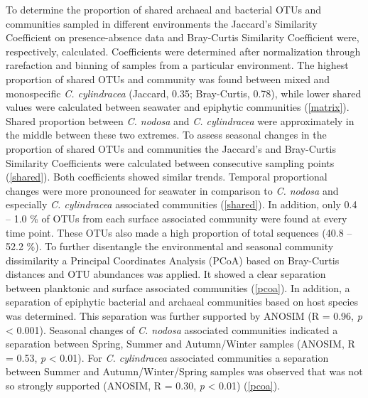 \documentclass[12pt,]{article}
\begin{document}
To determine the proportion of shared archaeal and bacterial OTUs and
communities sampled in different environments the Jaccard's Similarity
Coefficient on presence-absence data and Bray-Curtis Similarity
Coefficient were, respectively, calculated. Coefficients were determined
after normalization through rarefaction and binning of samples from a
particular environment. The highest proportion of shared OTUs and
community was found between mixed and monospecific \emph{C. cylindracea}
(Jaccard, 0.35; Bray-Curtis, 0.78), while lower shared values were
calculated between seawater and epiphytic communities
(\autoref{matrix}). Shared proportion between \emph{C. nodosa} and
\emph{C. cylindracea} were approximately in the middle between these two
extremes. To assess seasonal changes in the proportion of shared OTUs
and communities the Jaccard's and Bray-Curtis Similarity Coefficients
were calculated between consecutive sampling points (\autoref{shared}).
Both coefficients showed similar trends. Temporal proportional changes
were more pronounced for seawater in comparison to \emph{C. nodosa} and
especially \emph{C. cylindracea} associated communities
(\autoref{shared}). In addition, only 0.4 -- 1.0 \si{\percent} of OTUs
from each surface associated community were found at every time point.
These OTUs also made a high proportion of total sequences (40.8 -- 52.2
\si{\percent}). To further disentangle the environmental and seasonal
community dissimilarity a Principal Coordinates Analysis (PCoA) based on
Bray-Curtis distances and OTU abundances was applied. It showed a clear
separation between planktonic and surface associated communities
(\autoref{pcoa}). In addition, a separation of epiphytic bacterial and
archaeal communities based on host species was determined. This
separation was further supported by ANOSIM (R = 0.96, \emph{p}
\textless{} 0.001). Seasonal changes of \emph{C. nodosa} associated
communities indicated a separation between Spring, Summer and
Autumn/Winter samples (ANOSIM, R = 0.53, \emph{p} \textless{} 0.01). For
\emph{C. cylindracea} associated communities a separation between Summer
and Autumn/Winter/Spring samples was observed that was not so strongly
supported (ANOSIM, R = 0.30, \emph{p} \textless{} 0.01)
(\autoref{pcoa}).
\end{document}
